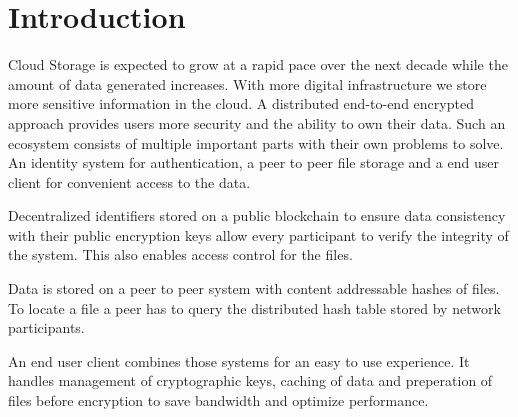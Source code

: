 \section{Introduction}

Cloud Storage is expected to grow at a rapid pace over the next
decade while the amount of data generated increases. With more
digital infrastructure we store more sensitive information in
the cloud. A distributed end-to-end encrypted approach provides
users more security and the ability to own their data.
Such an ecosystem consists of multiple important parts with their
own problems to solve. An identity system for authentication,
a peer to peer file storage and a end user client for convenient
access to the data.

Decentralized identifiers stored on a public blockchain to ensure
data consistency with their public encryption keys allow every
participant to verify the integrity of the system. This also
enables access control for the files.

Data is stored on a peer to peer system with content addressable
hashes of files. To locate a file a peer has to query the
distributed hash table stored by network participants.

An end user client combines those systems for an easy to use
experience. It handles management of cryptographic keys,
caching of data and preperation of files before encryption to
save bandwidth and optimize performance.
 